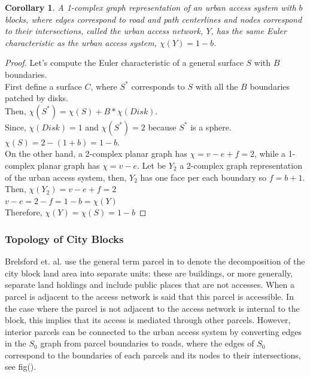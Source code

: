 \documentclass[10pt]{article}
\newtheorem{corollary}{Corollary}[theorem]
\begin{document}
\begin{corollary}
    A 1-complex graph representation of an urban access system with $b$ blocks, where edges correspond to road and path centerlines and nodes correspond to their intersections, called the urban access network, $Y$, has the same Euler characteristic as the urban access system, $\chi(Y)=1-b$. 
\end{corollary}
\begin{proof}
	Let's compute the Euler characteristic of a general surface $S$ with $B$ boundaries.\\
	
	First define a surface $C$, where $S^*$ corresponds to $S$ with all the $B$ boundaries patched by disks.\\
	
	Then,	$\chi(S^*)=\chi(S)+B*\chi(Disk)$.\\
	Since, $\chi(Disk)=1$ and $\chi(S^*)=2$ because $S^*$ is a sphere.\\
	
	$\chi(S)=2-(1+b)=1-b$.\\
	
	On the other hand, a 2-complex planar graph has $\chi=v-e+f=2$, while a 1-complex planar graph has $\chi=v-e$. Let be $Y_2$ a 2-complex graph representation of the urban access system, then, $Y_2$ has one face per each boundary so $f=b+1$.\\
	
	Then,	$\chi(Y_2)=v-e+f=2$\\
	$v-e=2-f=1-b=\chi(Y)$\\
	Therefore, $\chi(Y)=\chi(S)=1-b$
\end{proof}


\subsubsection{Topology of City Blocks}

Brelsford et. al. use the general term parcel in \cite{bre} to denote the decomposition of the city block land area into separate units: these are buildings, or more generally, separate land holdings and include public places that are not accesses. When a parcel is adjacent to the access network is said that this parcel is accessible. In the case where the parcel is not adjacent to the access network is internal to the block, this implies that its access is mediated through other parcels. However, interior parcels can be connected to the urban access system by converting edges in the $S_0$ graph from parcel boundaries to roads, where the edges of $S_0$ correspond to the boundaries of each parcels and its nodes to their intersections, see fig().\\
\end{document}
